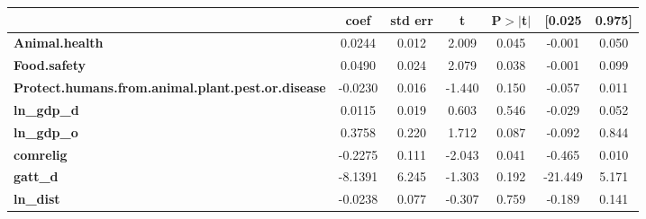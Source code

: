 \begin{center}
\begin{tabular}{lcccccc}
                                                          & \textbf{coef} & \textbf{std err} & \textbf{t} & \textbf{P$> |$t$|$} & \textbf{[0.025} & \textbf{0.975]}  \\
\midrule
\textbf{Animal.health}                                    &       0.0244  &        0.012     &     2.009  &         0.045        &       -0.001    &        0.050     \\
\textbf{Food.safety}                                      &       0.0490  &        0.024     &     2.079  &         0.038        &       -0.001    &        0.099     \\
\textbf{Protect.humans.from.animal.plant.pest.or.disease} &      -0.0230  &        0.016     &    -1.440  &         0.150        &       -0.057    &        0.011     \\
\textbf{ln\_gdp\_d}                                       &       0.0115  &        0.019     &     0.603  &         0.546        &       -0.029    &        0.052     \\
\textbf{ln\_gdp\_o}                                       &       0.3758  &        0.220     &     1.712  &         0.087        &       -0.092    &        0.844     \\
\textbf{comrelig}                                         &      -0.2275  &        0.111     &    -2.043  &         0.041        &       -0.465    &        0.010     \\
\textbf{gatt\_d}                                          &      -8.1391  &        6.245     &    -1.303  &         0.192        &      -21.449    &        5.171     \\
\textbf{ln\_dist}                                         &      -0.0238  &        0.077     &    -0.307  &         0.759        &       -0.189    &        0.141     \\
\bottomrule
\end{tabular}
\end{center}